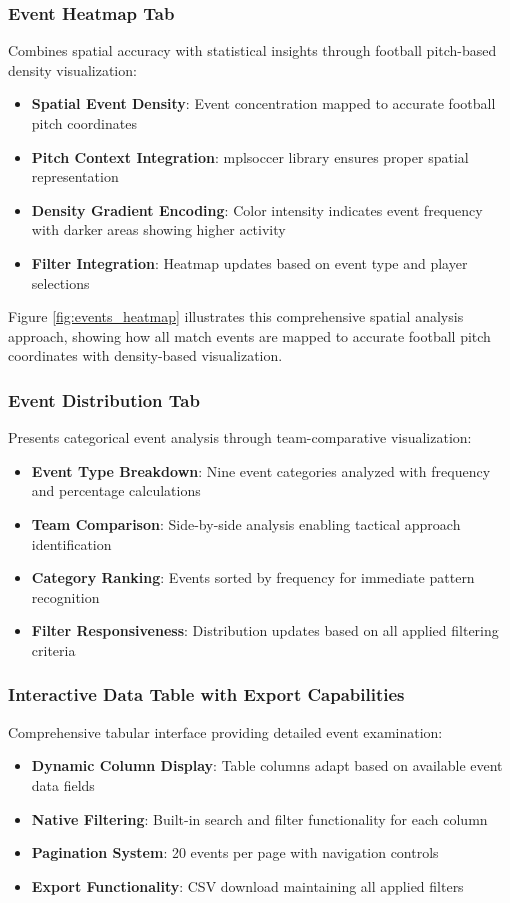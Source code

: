 \documentclass[12pt,a4paper]{article}
\begin{document}
\subsubsection{Event Heatmap Tab}
\label{sec:event_heatmap}
Combines spatial accuracy with statistical insights through football pitch-based density visualization:
\begin{itemize}
    \item \textbf{Spatial Event Density}: Event concentration mapped to accurate football pitch coordinates
    \item \textbf{Pitch Context Integration}: mplsoccer library ensures proper spatial representation
    \item \textbf{Density Gradient Encoding}: Color intensity indicates event frequency with darker areas showing higher activity
    \item \textbf{Filter Integration}: Heatmap updates based on event type and player selections
\end{itemize}

Figure \ref{fig:events_heatmap} illustrates this comprehensive spatial analysis approach, showing how all match events are mapped to accurate football pitch coordinates with density-based visualization.



\subsubsection{Event Distribution Tab}
Presents categorical event analysis through team-comparative visualization:
\begin{itemize}
    \item \textbf{Event Type Breakdown}: Nine event categories analyzed with frequency and percentage calculations
    \item \textbf{Team Comparison}: Side-by-side analysis enabling tactical approach identification
    \item \textbf{Category Ranking}: Events sorted by frequency for immediate pattern recognition
    \item \textbf{Filter Responsiveness}: Distribution updates based on all applied filtering criteria
\end{itemize}


\subsubsection{Interactive Data Table with Export Capabilities}
Comprehensive tabular interface providing detailed event examination:
\begin{itemize}
    \item \textbf{Dynamic Column Display}: Table columns adapt based on available event data fields
    \item \textbf{Native Filtering}: Built-in search and filter functionality for each column
    \item \textbf{Pagination System}: 20 events per page with navigation controls
    \item \textbf{Export Functionality}: CSV download maintaining all applied filters
\end{itemize}
\end{document}
